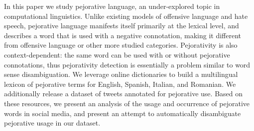 In this paper we study pejorative language, an under-explored topic in computational linguistics. Unlike existing models of offensive language and hate speech, pejorative language manifests itself primarily at the lexical level, and describes a word that is used with a negative connotation, making it different from offensive language or other more studied categories. Pejorativity is also context-dependent: the same word can be used with or without pejorative connotations, thus pejorativity detection is essentially a problem similar to word sense disambiguation. We leverage online dictionaries to build a multilingual lexicon of pejorative terms for English, Spanish, Italian, and Romanian. We additionally release a dataset of tweets annotated for pejorative use. Based on these resources, we present an analysis of the usage and occurrence of pejorative words in social media, and present an attempt to automatically disambiguate pejorative usage in our dataset.
